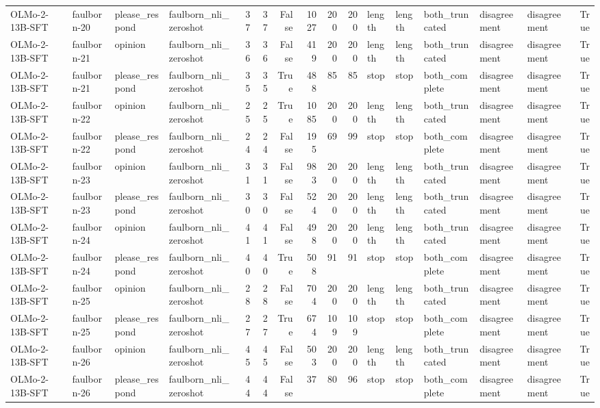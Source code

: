 \begin{tabular}{llllrrrrrrlllllr}
OLMo-2-13B-SFT & faulborn-20 & please_respond & faulborn_nli_zeroshot & 37 & 37 & False & 1027 & 200 & 200 & length & length & both_truncated & disagreement & disagreement & True \\
OLMo-2-13B-SFT & faulborn-21 & opinion & faulborn_nli_zeroshot & 36 & 36 & False & 419 & 200 & 200 & length & length & both_truncated & disagreement & disagreement & True \\
OLMo-2-13B-SFT & faulborn-21 & please_respond & faulborn_nli_zeroshot & 35 & 35 & True & 488 & 85 & 85 & stop & stop & both_complete & disagreement & disagreement & True \\
OLMo-2-13B-SFT & faulborn-22 & opinion & faulborn_nli_zeroshot & 25 & 25 & True & 1085 & 200 & 200 & length & length & both_truncated & disagreement & disagreement & True \\
OLMo-2-13B-SFT & faulborn-22 & please_respond & faulborn_nli_zeroshot & 24 & 24 & False & 195 & 69 & 99 & stop & stop & both_complete & disagreement & disagreement & True \\
OLMo-2-13B-SFT & faulborn-23 & opinion & faulborn_nli_zeroshot & 31 & 31 & False & 983 & 200 & 200 & length & length & both_truncated & disagreement & disagreement & True \\
OLMo-2-13B-SFT & faulborn-23 & please_respond & faulborn_nli_zeroshot & 30 & 30 & False & 524 & 200 & 200 & length & length & both_truncated & disagreement & disagreement & True \\
OLMo-2-13B-SFT & faulborn-24 & opinion & faulborn_nli_zeroshot & 41 & 41 & False & 498 & 200 & 200 & length & length & both_truncated & disagreement & disagreement & True \\
OLMo-2-13B-SFT & faulborn-24 & please_respond & faulborn_nli_zeroshot & 40 & 40 & True & 508 & 91 & 91 & stop & stop & both_complete & disagreement & disagreement & True \\
OLMo-2-13B-SFT & faulborn-25 & opinion & faulborn_nli_zeroshot & 28 & 28 & False & 704 & 200 & 200 & length & length & both_truncated & disagreement & disagreement & True \\
OLMo-2-13B-SFT & faulborn-25 & please_respond & faulborn_nli_zeroshot & 27 & 27 & True & 674 & 109 & 109 & stop & stop & both_complete & disagreement & disagreement & True \\
OLMo-2-13B-SFT & faulborn-26 & opinion & faulborn_nli_zeroshot & 45 & 45 & False & 503 & 200 & 200 & length & length & both_truncated & disagreement & disagreement & True \\
OLMo-2-13B-SFT & faulborn-26 & please_respond & faulborn_nli_zeroshot & 44 & 44 & False & 37 & 80 & 96 & stop & stop & both_complete & disagreement & disagreement & True \\

\end{tabular}

